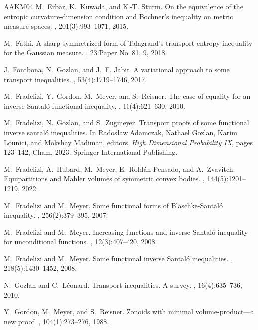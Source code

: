\documentclass[10pt]{amsart}
\theoremstyle{definition}
\theoremstyle{remark}
\begin{document}
\begin{thebibliography}{AAKM04}
M.~Erbar, K.~Kuwada, and K.-T. Sturm.
\newblock On the equivalence of the entropic curvature-dimension condition and
  {Bochner}'s inequality on metric measure spaces.
, 201(3):993--1071, 2015.

M.~Fathi.
\newblock A sharp symmetrized form of {T}alagrand's transport-entropy
  inequality for the {G}aussian measure.
, 23:Paper No. 81, 9, 2018.

J.~Fontbona, N.~Gozlan, and J.~F. Jabir.
\newblock A variational approach to some transport inequalities.
, 53(4):1719--1746,
  2017.

M.~Fradelizi, Y.~Gordon, M.~Meyer, and S.~Reisner.
\newblock The case of equality for an inverse {S}antal\'{o} functional
  inequality.
, 10(4):621--630, 2010.

M.~Fradelizi, N.~Gozlan, and S.~Zugmeyer.
\newblock Transport proofs of some functional inverse santal{\'o} inequalities.
\newblock In Rados{\l}aw Adamczak, Nathael Gozlan, Karim Lounici, and Mokshay
  Madiman, editors, {\em High Dimensional Probability IX}, pages 123--142,
  Cham, 2023. Springer International Publishing.

M.~Fradelizi, A.~Hubard, M.~Meyer, E.~Rold\'{a}n-Pensado, and A.~Zvavitch.
\newblock Equipartitions and {M}ahler volumes of symmetric convex bodies.
, 144(5):1201--1219, 2022.

M.~Fradelizi and M.~Meyer.
\newblock Some functional forms of {B}laschke-{S}antal\'{o} inequality.
, 256(2):379--395, 2007.

M.~Fradelizi and M.~Meyer.
\newblock Increasing functions and inverse {S}antal\'{o} inequality for
  unconditional functions.
, 12(3):407--420, 2008.

M.~Fradelizi and M.~Meyer.
\newblock Some functional inverse {S}antal\'{o} inequalities.
, 218(5):1430--1452, 2008.

N.~Gozlan and C.~L{\'e}onard.
\newblock Transport inequalities. {A} survey.
, 16(4):635--736, 2010.

Y.~Gordon, M.~Meyer, and S.~Reisner.
\newblock Zonoids with minimal volume-product---a new proof.
, 104(1):273--276, 1988.


\end{thebibliography}
\end{document}
